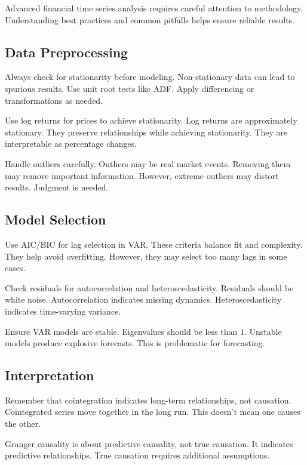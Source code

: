 Advanced financial time series analysis requires careful attention to methodology. Understanding best practices and common pitfalls helps ensure reliable results.

\subsection{Data Preprocessing}

Always check for stationarity before modeling. Non-stationary data can lead to spurious results. Use unit root tests like ADF. Apply differencing or transformations as needed.

Use log returns for prices to achieve stationarity. Log returns are approximately stationary. They preserve relationships while achieving stationarity. They are interpretable as percentage changes.

Handle outliers carefully. Outliers may be real market events. Removing them may remove important information. However, extreme outliers may distort results. Judgment is needed.

\subsection{Model Selection}

Use AIC/BIC for lag selection in VAR. These criteria balance fit and complexity. They help avoid overfitting. However, they may select too many lags in some cases.

Check residuals for autocorrelation and heteroscedasticity. Residuals should be white noise. Autocorrelation indicates missing dynamics. Heteroscedasticity indicates time-varying variance.

Ensure VAR models are stable. Eigenvalues should be less than 1. Unstable models produce explosive forecasts. This is problematic for forecasting.

\subsection{Interpretation}

Remember that cointegration indicates long-term relationships, not causation. Cointegrated series move together in the long run. This doesn't mean one causes the other.

Granger causality is about predictive causality, not true causation. It indicates predictive relationships. True causation requires additional assumptions.

